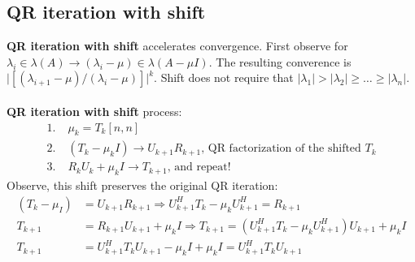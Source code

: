 \documentclass{article}
\newcommand{\abs}[1]{\lvert#1\rvert}
\begin{document}
\subsection{QR iteration with shift}
\textbf{QR iteration with shift} accelerates convergence. First observe for $\lambda_i \in \lambda(A) \rightarrow (\lambda_i - \mu) \in \lambda(A - \mu I)$. The resulting converence is $\abs{[(\lambda_{i+1} - \mu) / (\lambda_i - \mu)]}^k$. Shift does not require that $\abs{\lambda_1} > \abs{\lambda_2} \geq \dots \geq \abs{\lambda_n}$.\\ \\
\textbf{QR iteration with shift} process:
\begin{align*}
    1. \;& \mu_k = T_k[n, n]\\
    2. \;& (T_k - \mu_k I) \longrightarrow U_{k+1}R_{k+1} \textrm{, QR factorization of the shifted } T_k\\
    3. \;& R_kU_k + \mu_k I \longrightarrow T_{k+1} \textrm{, and repeat!}
\end{align*}
Observe, this shift preserves the original QR iteration:
\begin{align*}
    (T_k - \mu_ I) &= U_{k+1}R_{k+1} \Longrightarrow U_{k+1}^HT_k - \mu_k U_{k+1}^H = R_{k+1}\\
    T_{k+1} &= R_{k+1}U_{k+1} + \mu_k I \Longrightarrow T_{k+1} = (U_{k+1}^HT_k - \mu_k U_{k+1}^H)U_{k+1} + \mu_k I\\
    T_{k+1} &= U_{k+1}^HT_kU_{k+1} - \mu_k I + \mu_k I = U_{k+1}^HT_kU_{k+1}
\end{align*}
\end{document}
